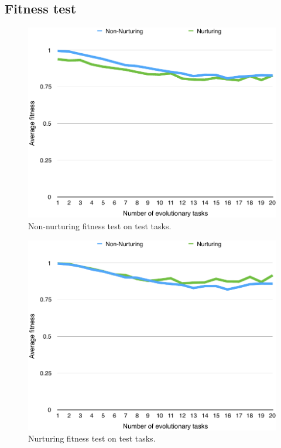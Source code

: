 \documentclass[master]{outhesis}
\begin{document}
\subsection{Fitness test}

\begin{figure}[H]
	\centering
	\includegraphics{NonNurturingFitnessTestPlot.pdf}
	\caption{Non-nurturing fitness test on test tasks.}
\end{figure}

\begin{figure}[H]
	\centering
	\includegraphics{NurturingFitnessTestPlot.pdf}
	\caption{Nurturing fitness test on test tasks.}
\end{figure}
\end{document}
